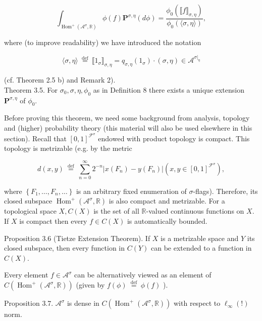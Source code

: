 \documentclass[10pt]{article}
\begin{document}
\begin{equation*}
\int_{\operatorname{Hom}^{+}\left(\mathcal{A}^{\sigma}, \mathbb{R}\right)} \phi(f) \mathbf{P}^{\sigma, \eta}(d \phi)=\frac{\phi_{0}\left(\llbracket f \rrbracket_{\sigma, \eta}\right)}{\phi_{0}(\langle\sigma, \eta\rangle)}, \tag{17}
\end{equation*}


where (to improve readability) we have introduced the notation

$$
\langle\sigma, \eta\rangle \stackrel{\text { def }}{=} \llbracket 1_{\sigma} \rrbracket_{\sigma, \eta}=q_{\sigma, \eta}\left(1_{\sigma}\right) \cdot(\sigma, \eta) \in \mathcal{A}^{\left.\sigma\right|_{\eta}}
$$

(cf. Theorem 2.5 b) and Remark 2).\\
Theorem 3.5. For $\sigma_{0}, \sigma, \eta, \phi_{0}$ as in Definition 8 there exists a unique extension $\mathbf{P}^{\sigma, \eta}$ of $\phi_{0}$.

Before proving this theorem, we need some background from analysis, topology and (higher) probability theory (this material will also be used elsewhere in this section). Recall that $[0,1]^{\mathcal{F}^{\sigma}}$ endowed with product topology is compact. This topology is metrizable (e.g. by the metric

$$
d(x, y) \stackrel{\text { def }}{=} \sum_{n=0}^{\infty} 2^{-n}\left|x\left(F_{n}\right)-y\left(F_{n}\right)\right|\left(x, y \in[0,1]^{\mathcal{F}^{\sigma}}\right),
$$

where $\left\{F_{1}, \ldots, F_{n}, \ldots\right\}$ is an arbitrary fixed enumeration of $\sigma$-flags). Therefore, its closed subspace $\operatorname{Hom}^{+}\left(\mathcal{A}^{\sigma}, \mathbb{R}\right)$ is also compact and metrizable. For a topological space $X, C(X)$ is the set of all $\mathbb{R}$-valued continuous functions on $X$. If $X$ is compact then every $f \in C(X)$ is automatically bounded.

Proposition 3.6 (Tietze Extension Theorem). If $X$ is a metrizable space and $Y$ its closed subspace, then every function in $C(Y)$ can be extended to a function in $C(X)$.

Every element $f \in \mathcal{A}^{\sigma}$ can be alternatively viewed as an element of $C\left(\operatorname{Hom}^{+}\left(\mathcal{A}^{\sigma}, \mathbb{R}\right)\right)$ (given by $f(\phi) \stackrel{\text { def }}{=} \phi(f)$ ).

Proposition 3.7. $\mathcal{A}^{\sigma}$ is dense in $C\left(\operatorname{Hom}^{+}\left(\mathcal{A}^{\sigma}, \mathbb{R}\right)\right)$ with respect to $\ell_{\infty}(!)$ norm.
\end{document}
